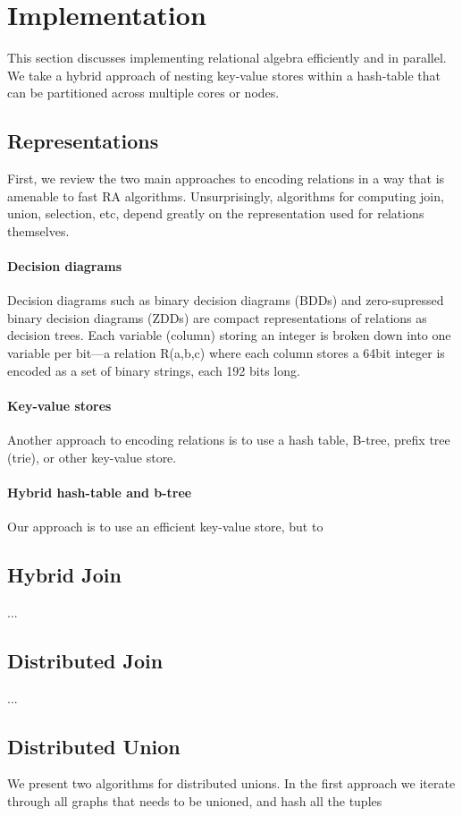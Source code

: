 

\section{Implementation}
\label{sec:impl}
%
This section discusses implementing relational algebra efficiently and in parallel. We take a hybrid approach of nesting key-value stores within a hash-table that can be partitioned across multiple cores or nodes. 


\subsection{Representations}

First, we review the two main approaches to encoding relations in a way that is amenable to fast RA algorithms. Unsurprisingly, algorithms for computing join, union, selection, etc, depend greatly on the representation used for relations themselves.

\paragraph{Decision diagrams} Decision diagrams such as binary decision diagrams (BDDs) and zero-supressed binary decision diagrams (ZDDs) are compact representations of relations as decision trees. Each variable (column) storing an integer is broken down into one variable per bit---a relation R(a,b,c) where each column stores a 64bit integer is encoded as a set of binary strings, each 192 bits long.  


\paragraph{Key-value stores} Another approach to encoding relations is to use a hash table, B-tree, prefix tree (trie), or other key-value store.


\paragraph{Hybrid hash-table and b-tree} Our approach is to use an efficient key-value store, but to



\subsection{Hybrid Join}

...

\subsection{Distributed Join}

...


\subsection{Distributed Union}
We present two algorithms for distributed unions. In the first approach we iterate through all graphs that needs to be unioned, and hash all the tuples 